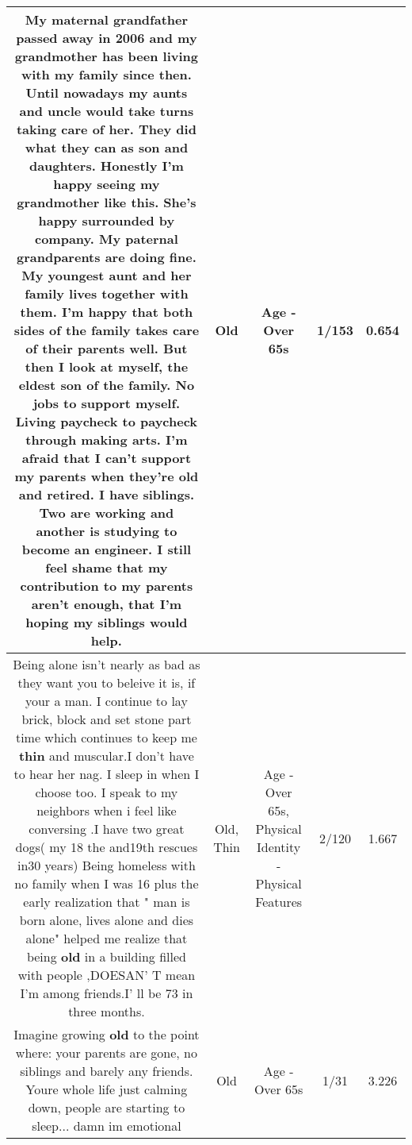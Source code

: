 \documentclass[11pt]{article}
\newlength\mylength
\begin{document}
\begin{center}
\begin{longtable}{|C{.65\mylength}|C{.30\mylength}|C{.12\mylength}|C{.12\mylength}|C{.12\mylength}|}
  \small My maternal grandfather passed away in 2006 and my grandmother has been living with my family since then. Until nowadays my aunts and uncle would take turns taking care of her. They did what they can as son and daughters. Honestly I'm happy seeing my grandmother like this. She's happy surrounded by company. My paternal grandparents are doing fine. My youngest aunt and her family lives together with them. I'm happy that both sides of the family takes care of their parents well. But then I look at myself, the eldest son of the family. No jobs to support myself. Living paycheck to paycheck through making arts. I'm afraid that I can't support my parents when they're \textbf{old} and retired. I have siblings. Two are working and another is studying to become an engineer. I still feel shame that my contribution to my parents aren't enough, that I'm hoping my siblings would help.\normalsize   & Old & Age - Over 65s & 1/153 & 0.654 \\  \hline
  \small Being alone isn't nearly as bad as they want you to beleive it is, if your a man. I continue to lay brick,  block and set stone part time which continues to keep me \textbf{thin} and muscular.I don't have  to hear her nag. I sleep in when I choose too. I speak to my neighbors when i feel like conversing .I have two great dogs( my 18 the and19th rescues in30 years) Being homeless with no family when I was 16 plus the early realization that " man is born alone, lives alone and dies alone" helped me realize that being \textbf{old} in a building filled with people ,DOESAN' T mean I'm among friends.I' ll be 73 in three months.\normalsize   & Old, Thin & Age - Over 65s, Physical Identity - Physical Features & 2/120 & 1.667 \\  \hline
  \small Imagine growing \textbf{old} to the point where: your parents are gone,  no siblings and barely any friends. Youre whole life just calming down, people are starting to sleep... damn im emotional\normalsize   & Old & Age - Over 65s & 1/31 & 3.226 \\  \hline

\end{longtable}
\end{center}
\end{document}
